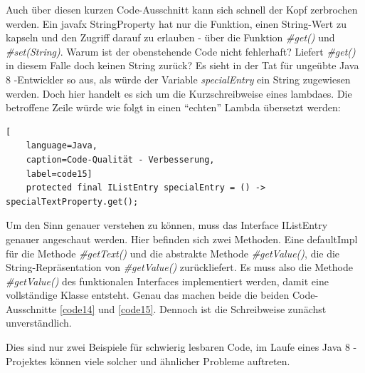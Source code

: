 Auch über diesen kurzen Code-Ausschnitt kann sich schnell der Kopf zerbrochen werden. Ein \gls{javafx} StringProperty hat nur die Funktion, einen String-Wert zu kapseln und den Zugriff darauf zu erlauben - über die Funktion \textit{\#get()} und \textit{\#set(String)}. Warum ist der obenstehende Code nicht fehlerhaft? Liefert \textit{\#get()} in diesem Falle doch keinen String zurück?
Es sieht in der Tat für ungeübte Java 8 -Entwickler so aus, als würde der Variable \textit{specialEntry} ein String zugewiesen werden. Doch hier handelt es sich um die Kurzschreibweise eines \gls{lambda}es. Die betroffene Zeile würde wie folgt in einen \enquote{echten} Lambda übersetzt werden:

\begin{lstlisting}[
    language=Java,
    caption=Code-Qualität - Verbesserung,
    label=code15]
	protected final IListEntry specialEntry = () -> specialTextProperty.get();
\end{lstlisting}

Um den Sinn genauer verstehen zu können, muss das Interface IListEntry genauer angeschaut werden. Hier befinden sich zwei Methoden. Eine \gls{defaultImpl} für die Methode \textit{\#getText()} und die abstrakte Methode \textit{\#getValue()}, die die String-Repräsentation von \textit{\#getValue()} zurückliefert. Es muss also die Methode \textit{\#getValue()} des funktionalen Interfaces implementiert werden, damit eine vollständige Klasse entsteht. Genau das machen beide die beiden Code-Ausschnitte \ref{code14} und \ref{code15}. Dennoch ist die Schreibweise zunächst unverständlich.

Dies sind nur zwei Beispiele für schwierig lesbaren Code, im Laufe eines Java 8 -Projektes können viele solcher und ähnlicher Probleme auftreten.